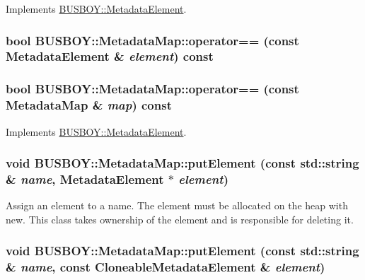 Implements \hyperlink{classBUSBOY_1_1MetadataElement_a9895dfd3f251e26e8d818871405ce4c7}{BUSBOY::MetadataElement}.\hypertarget{classBUSBOY_1_1MetadataMap_a06e6202a354d6152e913470b815aa7e2}{
\subsubsection[{operator==}]{\setlength{\rightskip}{0pt plus 5cm}bool BUSBOY::MetadataMap::operator== (const {\bf MetadataElement} \& {\em element}) const}}
\label{classBUSBOY_1_1MetadataMap_a06e6202a354d6152e913470b815aa7e2}
\hypertarget{classBUSBOY_1_1MetadataMap_ae8a5e06c1baa5231744a7b98d49a37f7}{
\subsubsection[{operator==}]{\setlength{\rightskip}{0pt plus 5cm}bool BUSBOY::MetadataMap::operator== (const {\bf MetadataMap} \& {\em map}) const}}
\label{classBUSBOY_1_1MetadataMap_ae8a5e06c1baa5231744a7b98d49a37f7}


Implements \hyperlink{classBUSBOY_1_1MetadataElement_ac56f20521c49259ff043c2d69bc4c08e}{BUSBOY::MetadataElement}.\hypertarget{classBUSBOY_1_1MetadataMap_a02a2e69c416662644ca616b0f44c4ad9}{
\subsubsection[{putElement}]{\setlength{\rightskip}{0pt plus 5cm}void BUSBOY::MetadataMap::putElement (const std::string \& {\em name}, \/  {\bf MetadataElement} $\ast$ {\em element})}}
\label{classBUSBOY_1_1MetadataMap_a02a2e69c416662644ca616b0f44c4ad9}


Assign an element to a name. The element must be allocated on the heap with new. This class takes ownership of the element and is responsible for deleting it. \hypertarget{classBUSBOY_1_1MetadataMap_a5f0c318e585d023fe795c73c383c02ef}{
\subsubsection[{putElement}]{\setlength{\rightskip}{0pt plus 5cm}void BUSBOY::MetadataMap::putElement (const std::string \& {\em name}, \/  const {\bf CloneableMetadataElement} \& {\em element})}}
\label{classBUSBOY_1_1MetadataMap_a5f0c318e585d023fe795c73c383c02ef}


